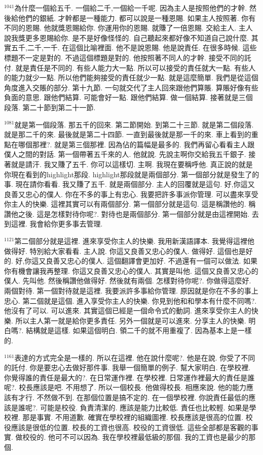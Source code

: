 \documentclass{book}
\begin{document}
$^{1041}$為什麼一個給五千.
一個給二千,一個給一千呢.
因為主人是按照他們的才幹.
然後給他們的銀紙.
才幹都是一種能力.
都可以說是一種恩賜.
如果主人按照著.
你有不同的恩賜.
他就獎恩賜給你.
你運用你的恩賜.
就賺了一倍恩賜.
交給主人.
主人說我獎更多恩賜給你.
是不是好像怪怪的.
自己聽起來都好像不知道自己說什麼.
其實五千,二千,一千.
在這個比喻裡面.
他不是說恩賜.
他是說責任.
在很多時候.
這些標題不一定是對的.
不過這個標題是對的.
他按照著不同人的才幹.
接受不同的託付.
就是責任是不同的.
有些人能力大一點.
所以可以接受的責任就大一點.
有些人的能力就少一點.
所以他們能夠接受的責任就少一點.
就是這麼簡單.
我們是從這個角度進入交賬的部分.
第十九節.
一句就交代了主人回來跟他們算賬.
算賬好像有些負面的意思.
跟他們結算.
可能會好一點.
跟他們結算.
做一個結算.
接著就是三個段落.
第二十節到第二十一節.

$^{1081}$就是第一個段落.
那五千的回來.
第二節開始.
到第二十三節.
就是第二個段落.
就是那二千的來.
最後就是第二十四節.
一直到最後就是那一千的來.
車上看到的重點在哪個那裡?.
就是第三個那裡.
因為佔的篇幅是最多的.
我們再留心看看主人跟僕人之間的對話.
第一個帶著五千來的人.
他就說.
先說主啊你交給我五千銀子.
接著就是請汗.
我又賺了五千.
你可以這樣切.
主啊.
我現在要稱呼他.
真正說的就是你現在看到的highlight那段.
highlight那段就是兩個部分.
第一個部分就是發生了的事.
現在請你看看.
我又賺了五千.
就是兩個部分.
主人的回覆就是這句.
好,你這又良善又忠心的僕人.
你在不多的事上有忠心.
我要把許多事派你管理.
可以盡來享受你主人的快樂.
這裡其實可以有兩個部分.
第一個部分就是這句.
這是稱讚他的.
稱讚他之後.
這是怎樣對待你呢?.
對待也是兩個部分.
第一個部分就是由這裡開始.
去到這裡.
我會給你更多事去管理.

$^{1121}$第二個部分就是這裡.
進來享受你主人的快樂.
我用新漢語譯本.
我覺得這裡他做得好.
特別給大家看看.
主人說.
你這又良善又忠心的僕人.
做得好.
這個也是好的.
好,你這又良善又忠心的僕人.
這個翻譯會更加好.
不過還有一個可以做法.
如果你有機會讓我再整理.
你這又良善又忠心的僕人.
其實是叫他.
這個又良善又忠心的僕人.
先叫他.
然後稱讚他做得好.
然後就有兩個.
怎樣對待你呢?.
你做得這麼好.
兩個對待.
第一個對待就是這裡.
我要派許多事給你管理.
原因就是你在不多的事上忠心.
第二個就是這個.
進入享受你主人的快樂.
你見到他和和學本有什麼不同嗎?.
他沒有了可以.
可以進來.
其實這個已經是一個命令式的動詞.
進來享受你主人的快樂.
所以主人第一就是給你更多責任.
另外一個就是可以進來.
分享主人的快樂.
明白嗎?.
結構就是這樣.
如果這個明白.
領二千的就不用重複了.
因為基本上是一樣的.

$^{1161}$表達的方式完全是一樣的.
所以在這裡.
他在說什麼呢?.
他是在說.
你受了不同的託付.
你是要忠心去做好那件事.
我舉一個簡單的例子.
幫大家明白.
在學校裡.
你覺得誰的責任是最大的?.
在日常運作裡.
在學校裡.
日常運作裡最大的責任是誰呢?.
校長應該是吧.
不用想了.
所以一個校長.
他做得校長.
相應來說.
他的能力應該有才行.
不然做不到.
在那個位置是搞不定的.
在一個學校裡.
你說責任最低的應該是誰呢?.
可能是校役.
負責清潔的.
應該是能力比較低.
責任也比較輕.
如果是學校裡.
那是事實.
不用道歉.
確實在學校裡的組織圖裡.
校長應該是很高的位置.
校役應該是很低的位置.
校長的工資也很高.
校役的工資很低.
這些全部都是客觀的事實.
做校役的.
他可不可以因為.
我在學校裡最低級的那個.
我的工資也是最少的那個.
\end{document}
